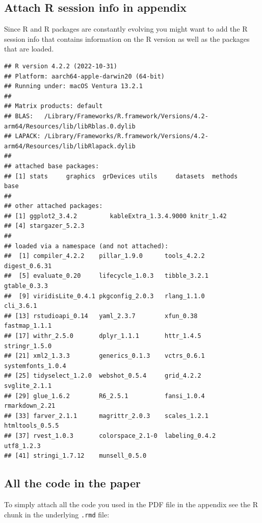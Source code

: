 \documentclass[
  12pt,
]{article}
\begin{document}
\hypertarget{sec:rsessioninfo}{%
\subsection{Attach R session info in appendix}\label{sec:rsessioninfo}}

Since R and R packages are constantly evolving you might want to add the
R session info that contains information on the R version as well as the
packages that are loaded.

\begin{verbatim}
## R version 4.2.2 (2022-10-31)
## Platform: aarch64-apple-darwin20 (64-bit)
## Running under: macOS Ventura 13.2.1
## 
## Matrix products: default
## BLAS:   /Library/Frameworks/R.framework/Versions/4.2-arm64/Resources/lib/libRblas.0.dylib
## LAPACK: /Library/Frameworks/R.framework/Versions/4.2-arm64/Resources/lib/libRlapack.dylib
## 
## attached base packages:
## [1] stats     graphics  grDevices utils     datasets  methods   base     
## 
## other attached packages:
## [1] ggplot2_3.4.2         kableExtra_1.3.4.9000 knitr_1.42           
## [4] stargazer_5.2.3      
## 
## loaded via a namespace (and not attached):
##  [1] compiler_4.2.2    pillar_1.9.0      tools_4.2.2       digest_0.6.31    
##  [5] evaluate_0.20     lifecycle_1.0.3   tibble_3.2.1      gtable_0.3.3     
##  [9] viridisLite_0.4.1 pkgconfig_2.0.3   rlang_1.1.0       cli_3.6.1        
## [13] rstudioapi_0.14   yaml_2.3.7        xfun_0.38         fastmap_1.1.1    
## [17] withr_2.5.0       dplyr_1.1.1       httr_1.4.5        stringr_1.5.0    
## [21] xml2_1.3.3        generics_0.1.3    vctrs_0.6.1       systemfonts_1.0.4
## [25] tidyselect_1.2.0  webshot_0.5.4     grid_4.2.2        svglite_2.1.1    
## [29] glue_1.6.2        R6_2.5.1          fansi_1.0.4       rmarkdown_2.21   
## [33] farver_2.1.1      magrittr_2.0.3    scales_1.2.1      htmltools_0.5.5  
## [37] rvest_1.0.3       colorspace_2.1-0  labeling_0.4.2    utf8_1.2.3       
## [41] stringi_1.7.12    munsell_0.5.0
\end{verbatim}

\hypertarget{all-the-code-in-the-paper}{%
\subsection{All the code in the paper}\label{all-the-code-in-the-paper}}

To simply attach all the code you used in the PDF file in the appendix
see the R chunk in the underlying \texttt{.rmd} file:
\end{document}
